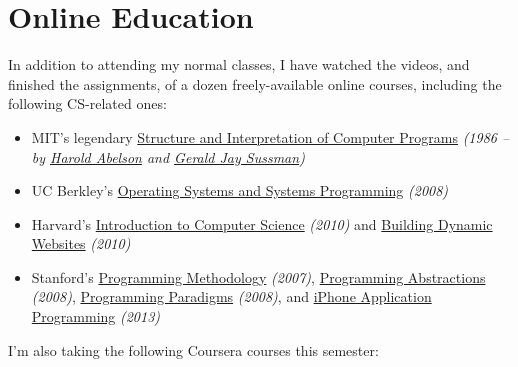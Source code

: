 \documentclass{tccv}
\begin{document}
{{\vspace{10pt}










\section{Online Education}

In addition to attending my normal classes, I have watched the videos, and finished the assignments, of a dozen freely-available online courses, \mbox{including} the following CS-related ones:

\begin{itemize}

\item MIT's legendary \href{http://groups.csail.mit.edu/mac/classes/6.001/abelson-sussman-lectures/}{Structure and Interpretation of Computer Programs} {\it(1986 -- by \href{https://en.wikipedia.org/wiki/Hal_Abelson}{Harold \mbox{Abelson}} and \href{https://en.wikipedia.org/wiki/Gerald_Jay_Sussman}{Gerald Jay Sussman})}

\item UC Berkley's \href{http://www.cs.berkeley.edu/~kubitron/courses/cs162-F08/}{Operating Systems and Systems Programming} {\it(2008)}

\item Harvard's \href{http://cs50.tv/2010/fall/}{Introduction to Computer Science} {\it(2010)} and \href{http://cs75.tv/2010/fall/}{Building Dynamic Websites} {\it(2010)}

\item Stanford's \href{http://see.stanford.edu/see/courseinfo.aspx?coll=824a47e1-135f-4508-a5aa-866adcae1111}{Programming Methodology} {\it(2007)}, \href{http://see.stanford.edu/see/courseinfo.aspx?coll=11f4f422-5670-4b4c-889c-008262e09e4e}{Programming Abstractions} {\it(2008)}, \href{http://see.stanford.edu/see/courseinfo.aspx?coll=2d712634-2bf1-4b55-9a3a-ca9d470755ee}{\mbox{Programming} Paradigms} {\it(2008)}, and \href{http://www.stanford.edu/class/cs193p}{iPhone Application \\ Programming} {\it(2013)}
	
\end{itemize}

I'm also taking the following Coursera courses this semester: 

\begin{itemize}


\end{itemize}}}
\end{document}
